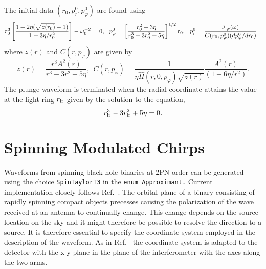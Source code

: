 The initial data $(r_0, p_{r}^0, p_{\varphi}^0)$ are found using
\begin{equation}
r_0^3 \left [ \frac {1 + 2 \eta (\sqrt{z(r_0)} -1 )}{1- 3\eta/r_0^2} \right ]-  \omega_0^{-2} = 0,\ \ 
p^0_\varphi = \left [\frac {r_0^2 - 3 \eta}{r_0^3 - 3 r_0^2 + 5 \eta} \right ]^{1/2}r_0,\ \ 
p^0_r = \frac {{\cal F}_\varphi(\omega)}{C(r_0,p^0_\varphi) (dp^0_\varphi/dr_0)}\ \ 
\end{equation}
where $z(r)$ and $C(r,p_\varphi)$ are given by
\begin{equation}
z(r) = \frac{r^3 A^2(r)}{r^3-3r^2+5 \eta},\ \ 
C(r,p_\varphi) = \frac{1}{\eta \widehat{H} (r,0,p_\varphi)
 \sqrt{z(r)}} \frac{A^2(r)}{(1-6\eta/r^2)}.
\end{equation}
The plunge waveform is terminated when the radial coordinate attains the value
at the light ring $r_{\rm lr}$ given by the solution to the equation,
\begin{equation}
r_{\rm lr}^3 - 3 r_{\rm lr}^2 + 5 \eta = 0.
\label{eq:LightRing}
\end{equation}
\section{Spinning Modulated Chirps}
\label{sec:smirches}
Waveforms from spinning black hole binaries at 2PN order can be
generated using the choice {\tt SpinTaylorT3} in the {\tt enum
Approximant.} Current implementation closely follows Ref.~\cite{ACST94}.
The orbital plane of a binary consisting of rapidly spinning compact
objects precesses causing the polarization of the wave received at an
antenna to continually change. This change depends on the source location
on the sky and it might therefore be possible to resolve the direction
to a source. It is therefore essential to specify the coordinate system 
employed in the description of the waveform. As in Ref.~\cite{ACST94}
the coordinate system is adapted to the detector with the x-y plane
in the plane of the interferometer with the axes along the two arms.

